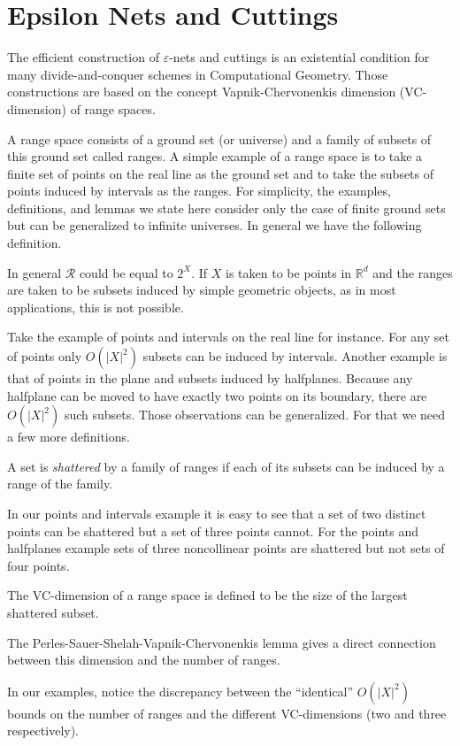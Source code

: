 \section{Epsilon Nets and Cuttings}%
\label{sec:divide-and-conquer:epsilon-nets-and-cuttings}

The efficient construction of \(\varepsilon\)-nets and cuttings
is an existential condition for many divide-and-conquer schemes
in Computational Geometry.
%
Those constructions are based on the concept Vapnik-Chervonenkis dimension
(VC-dimension) of range spaces.

A range space consists of a ground set (or universe) and a family of
subsets of this ground set called ranges.
%
A simple example of a range space is to take a finite set of points on the real
line as the ground set and to take the subsets of points induced by intervals
as the ranges.
%
For simplicity, the examples, definitions, and lemmas
we state here consider only the case of finite
ground sets but can be generalized to infinite universes.
%
In general we have the following definition.
%


In general \(\mathcal{R}\) could be equal to \(2^{X}\).
If \(X\) is taken to be points in \(\mathbb{R}^d\) and the ranges are taken to be subsets
induced by simple geometric objects, as in most applications, this is not possible.

Take the example of points and intervals on the real line for instance.
For any set of points only \(O({| X |}^2)\) subsets can be induced by
intervals.
%
Another example is that of points in the
plane and subsets induced by halfplanes. Because any halfplane can be moved to
have exactly two points on its boundary, there are \(O({| X |}^2)\) such subsets.
%
Those observations can be generalized. For that we need a few more definitions.

A set is \emph{shattered} by a family of ranges if each of its subsets can be induced by a
range of the family.

%
In our points and intervals example it is easy to see that a set of two
distinct points
can be shattered but a set of three points cannot.
%
For the points and halfplanes example sets of three noncollinear points are
shattered but not sets of four points.

The VC-dimension of a range space is defined to be the size of the largest
shattered subset.


The Perles-Sauer-Shelah-Vapnik-Chervonenkis lemma gives a direct connection
between this dimension and the number of ranges.

In our examples, notice the discrepancy between the ``identical''
\(O({|X|}^2)\) bounds on the number of ranges and the different VC-dimensions
(two and three respectively).

